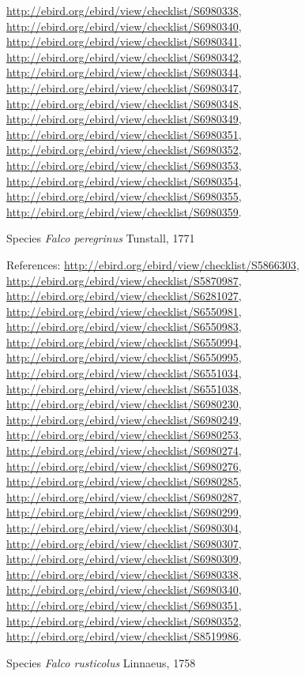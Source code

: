 \documentclass[9pt, article]{memoir}
\begin{document}
\begin{multicols}{2}
\url{http://ebird.org/ebird/view/checklist/S6980338}, 
\url{http://ebird.org/ebird/view/checklist/S6980340}, 
\url{http://ebird.org/ebird/view/checklist/S6980341}, 
\url{http://ebird.org/ebird/view/checklist/S6980342}, 
\url{http://ebird.org/ebird/view/checklist/S6980344}, 
\url{http://ebird.org/ebird/view/checklist/S6980347}, 
\url{http://ebird.org/ebird/view/checklist/S6980348}, 
\url{http://ebird.org/ebird/view/checklist/S6980349}, 
\url{http://ebird.org/ebird/view/checklist/S6980351}, 
\url{http://ebird.org/ebird/view/checklist/S6980352}, 
\url{http://ebird.org/ebird/view/checklist/S6980353}, 
\url{http://ebird.org/ebird/view/checklist/S6980354}, 
\url{http://ebird.org/ebird/view/checklist/S6980355}, 
\url{http://ebird.org/ebird/view/checklist/S6980359}.

\vspace{6pt}\noindent\hspace{36pt}Species \textit{Falco peregrinus} Tunstall, 1771


\vspace{6pt}References: 
\url{http://ebird.org/ebird/view/checklist/S5866303}, 
\url{http://ebird.org/ebird/view/checklist/S5870987}, 
\url{http://ebird.org/ebird/view/checklist/S6281027}, 
\url{http://ebird.org/ebird/view/checklist/S6550981}, 
\url{http://ebird.org/ebird/view/checklist/S6550983}, 
\url{http://ebird.org/ebird/view/checklist/S6550994}, 
\url{http://ebird.org/ebird/view/checklist/S6550995}, 
\url{http://ebird.org/ebird/view/checklist/S6551034}, 
\url{http://ebird.org/ebird/view/checklist/S6551038}, 
\url{http://ebird.org/ebird/view/checklist/S6980230}, 
\url{http://ebird.org/ebird/view/checklist/S6980249}, 
\url{http://ebird.org/ebird/view/checklist/S6980253}, 
\url{http://ebird.org/ebird/view/checklist/S6980274}, 
\url{http://ebird.org/ebird/view/checklist/S6980276}, 
\url{http://ebird.org/ebird/view/checklist/S6980285}, 
\url{http://ebird.org/ebird/view/checklist/S6980287}, 
\url{http://ebird.org/ebird/view/checklist/S6980299}, 
\url{http://ebird.org/ebird/view/checklist/S6980304}, 
\url{http://ebird.org/ebird/view/checklist/S6980307}, 
\url{http://ebird.org/ebird/view/checklist/S6980309}, 
\url{http://ebird.org/ebird/view/checklist/S6980338}, 
\url{http://ebird.org/ebird/view/checklist/S6980340}, 
\url{http://ebird.org/ebird/view/checklist/S6980351}, 
\url{http://ebird.org/ebird/view/checklist/S6980352}, 
\url{http://ebird.org/ebird/view/checklist/S8519986}.

\vspace{6pt}\noindent\hspace{36pt}Species \textit{Falco rusticolus} Linnaeus, 1758



\end{multicols}
\end{document}
